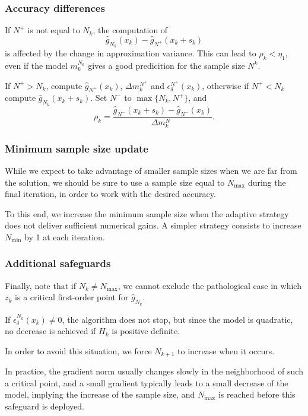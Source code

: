 \documentclass{beamer}
\begin{document}
\begin{frame}
\frametitle{Accuracy differences}

If $N^+$ is not equal to $N_k$, the computation of
\[
 \hat{g}_{N_k} (x_k) - \hat{g}_{N^+} ( x_k + s_k )
\]
is affected by the change in approximation variance.
This can lead to $\rho_k < \eta_1$, even if the model $m_k^{N_k}$ gives a good predicition for the sample size $N^k$.



\mbox{}

If $N^+ > N_k$, compute $\hat{g}_{N^+}(x_k)$, $\Delta m_k^{N^+}$ and
$\epsilon_{\delta}^{N^+}(x_k)$, otherwise if $N^+ < N_k$ compute $\hat{g}_{N_k}(x_k + s_k)$.
Set $N^-$ to $\max\lbrace N_k, N^+ \rbrace$, and %
\[
\rho_k = \frac{\hat{g}_{N^-}(x_k+s_k) - \hat{g}_{N^-}(x_k)}{\Delta
m_k^{N^-}}.
\]

\end{frame}

\begin{frame}
\frametitle{Minimum sample size update}

While we expect to take advantage of smaller sample sizes when we are far from the solution, we should be sure to use a sample size equal to $N_{\max}$ during the final iteration, in order to work with the desired accuracy.

\mbox{}

To this end, we increase the minimum sample size when the adaptive strategy does not deliver sufficient numerical gains. A simpler strategy consists to increase $N_{\min}$ by 1 at each iteration.

\end{frame}

\begin{frame}
\frametitle{Additional safeguards}

Finally, note that if $N_k \ne N_{\max}$, we cannot exclude the pathological case in which $z_k$ is a critical first-order point for $\hat{g}_{N_k}$.

If $\epsilon_{\delta}^{N_k}(x_k) \ne 0$, the algorithm does not stop, but since the model is quadratic, no decrease is achieved if $H_k$ is positive definite.

In order to avoid this situation, we force  $N_{k+1}$ to increase when it occurs.

\mbox{}

In practice, the gradient norm usually changes slowly in the neighborhood of such a critical point, and a small gradient typically leads to a small decrease of the model, implying the increase of the sample size, and $N_{\max}$ is reached before this safeguard is deployed.

\end{frame}
\end{document}
